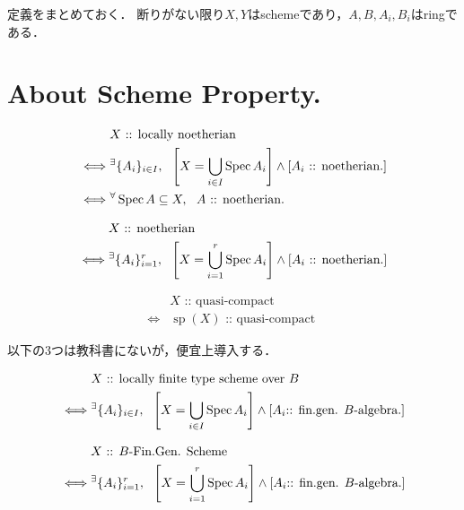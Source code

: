 \documentclass[a4paper]{jsarticle}
\begin{document}
定義をまとめておく．
断りがない限り$X,Y$はschemeであり，$A,B,A_i, B_i$はringである．

\section{About Scheme Property.}
\begin{Def}
\begin{align*}
    {}&     X\text{ :: locally noetherian } \\
    \iff&
            {}^{\exists} \{A_i\}_{i \in I},~~
            \left[X=\bigcup_{i \in I} \operatorname{Spec} A_i\right] \land \left[A_i\text{ :: noetherian.}\right] \\
    \iff&   {}^{\forall} \operatorname{Spec} A \subseteq X,~~ A\text{ :: noetherian.}
\end{align*}
\end{Def}

\begin{Def}
\begin{align*}
    {}&     X\text{ :: noetherian } \\
    \iff&   {}^{\exists} \{A_i\}_{i=1}^r,~~
            \left[X=\bigcup_{i=1}^r \operatorname{Spec} A_i\right] \land \left[A_i\text{ :: noetherian.}\right]
\end{align*}
\end{Def}

\begin{Def}
\begin{align*}
    {}&     X\text{ :: quasi-compact } \\
    \iff&   \operatorname{sp}(X)\text{ :: quasi-compact }
\end{align*}
\end{Def}

以下の3つは教科書にないが，便宜上導入する．
\begin{Def}
\begin{align*}
    {}&     X\text{ :: locally finite type scheme over $B$} \\
    \iff&
            {}^{\exists} \{A_i\}_{i \in I},~~
            \left[X=\bigcup_{i \in I} \operatorname{Spec} A_i\right] \land \left[A_i\text{:: fin.gen. $B$-algebra.}\right]
\end{align*}
\end{Def}

\begin{Def}
\begin{align*}
    {}&     X\text{ :: $B$-Fin.Gen. Scheme} \\
    \iff&  
            {}^{\exists} \{A_i\}_{i=1}^r,~~
            \left[X=\bigcup_{i=1}^r \operatorname{Spec} A_i\right] \land \left[A_i\text{:: fin.gen. $B$-algebra.}\right]
\end{align*}
\end{Def}
\end{document}
